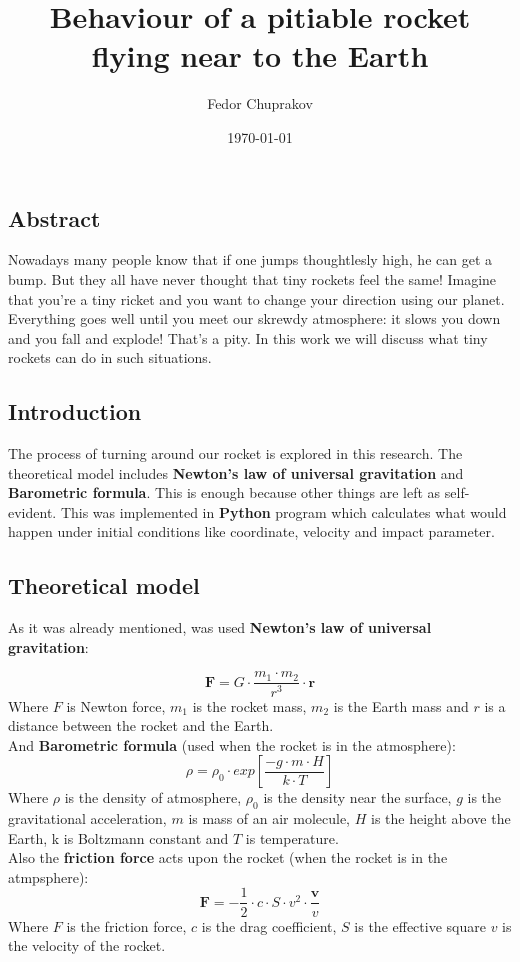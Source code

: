 \documentclass[a4paper,12pt]{article}
\author{Fedor Chuprakov}
\title{Behaviour of a pitiable rocket flying near to the Earth}
\date{\today}
\begin{document}
\maketitle
\newpage
\subsection*{Abstract}
Nowadays many people know that if one jumps thoughtlesly high, he can get a 
bump. But they all have never thought that tiny rockets feel the same! Imagine that
you're a tiny ricket and you want to change your direction using our planet.
Everything goes well until you meet our skrewdy atmosphere: it slows you down and you fall and explode! That's a pity. In this work we will discuss what tiny rockets can do in such situations.
\subsection*{Introduction}
The process of turning around our rocket is explored in this research.
The theoretical model includes \textbf{Newton's law of universal gravitation
} and \textbf{Barometric formula}. This is enough because other things are left as self-evident. This was implemented in \textbf{Python} program which calculates what would happen under initial conditions like coordinate, velocity and impact parameter.
\subsection*{Theoretical model}
As it was already mentioned, was used \textbf{Newton's law of universal gravitation}:

\begin{equation}\label{Newton}
	\textbf{F}=G\cdot \frac{m_1\cdot m_2}{r^3} \cdot \textbf{r}
\end{equation}
Where \textit{$F$} is Newton force, \textit{$m_1$} is the rocket mass, \textit{$m_2$} is the Earth mass and \textit{$r$} is a distance between the rocket and the Earth.\\
And \textbf{Barometric formula} (used when the rocket is in the atmosphere):
\begin{equation}\label{Barometric}
	\rho = \rho_0 \cdot exp \left[ \frac{-g \cdot m \cdot H}{k \cdot T} \right]
\end{equation}
Where \textit{$\rho$} is the density of atmosphere, \textit{$\rho_0$} is the density near the surface, \textit{$g$} is the gravitational acceleration, \textit{$m$} is mass of an air molecule, \textit{$H$} is the height above the Earth, k is Boltzmann constant and \textit{$T$} is temperature.\\
Also the \textbf{friction force} acts upon the rocket (when the rocket is in the atmpsphere):
\begin{equation}\label{Resistance}
	\textbf{F} = -\frac{1}{2} \cdot c \cdot S \cdot v^2 \cdot \frac{\textbf{v}}{v}
\end{equation}
Where \textit{$F$} is the friction force, \textit{$c$} is the drag coefficient, \textit{$S$} is the effective square \textit{$v$} is the velocity of the rocket.
\end{document}
